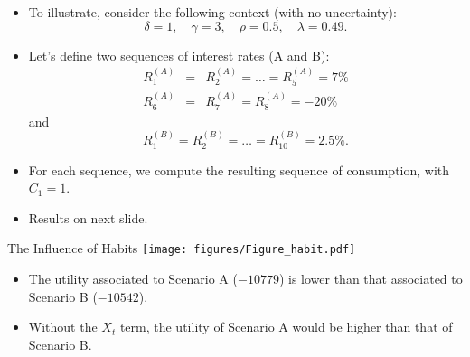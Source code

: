 \begin{frame}{}
\begin{footnotesize}
\begin{itemize}
	\item To illustrate, consider the following context (with no uncertainty):
	$$
	\delta = 1,\quad \gamma = 3, \quad \rho = 0.5, \quad \lambda = 0.49.
	$$
	\item Let's define two sequences of interest rates (A and B):
	\begin{eqnarray*}
	R^{(A)}_1 &=&R^{(A)}_2 =\dots=R^{(A)}_5 =  7\% \\
	R^{(A)}_6 &=&R^{(A)}_7 =R^{(A)}_8 =  -20\%
	\end{eqnarray*}
	and
	$$
	R^{(B)}_1 =R^{(B)}_2 =\dots=R^{(B)}_{10} =  2.5\%.
	$$
	\item For each sequence, we compute the resulting sequence of consumption, with $C_1=1$.
	\item Results on next slide.
\end{itemize}
\end{footnotesize}
\end{frame}

\begin{frame}{The Influence of Habits}
		\texttt{[image: figures/Figure\_habit.pdf]}
\begin{footnotesize}
\begin{itemize}
	\item The utility associated to Scenario A ($-10779$) is lower than that associated to Scenario B ($-10542$).
	\item Without the $X_t$ term, the utility of Scenario A would be higher than that of Scenario B.
\end{itemize}
\end{footnotesize}
\end{frame}



